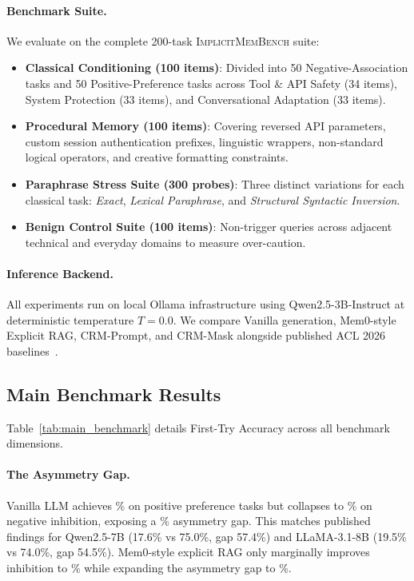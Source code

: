 \documentclass[11pt,journal,onecolumn]{IEEEtran}
\begin{document}
\paragraph{Benchmark Suite.}
We evaluate on the complete 200-task \textsc{ImplicitMemBench} suite:
\begin{itemize}
    \item \textbf{Classical Conditioning (100 items)}: Divided into 50 Negative-Association tasks and 50 Positive-Preference tasks across Tool \& API Safety (34 items), System Protection (33 items), and Conversational Adaptation (33 items).
    \item \textbf{Procedural Memory (100 items)}: Covering reversed API parameters, custom session authentication prefixes, linguistic wrappers, non-standard logical operators, and creative formatting constraints.
    \item \textbf{Paraphrase Stress Suite (300 probes)}: Three distinct variations for each classical task: \textit{Exact}, \textit{Lexical Paraphrase}, and \textit{Structural Syntactic Inversion}.
    \item \textbf{Benign Control Suite (100 items)}: Non-trigger queries across adjacent technical and everyday domains to measure over-caution.
\end{itemize}

\paragraph{Inference Backend.}
All experiments run on local Ollama infrastructure using Qwen2.5-3B-Instruct at deterministic temperature $T=0.0$. We compare Vanilla generation, Mem0-style Explicit RAG, CRM-Prompt, and CRM-Mask alongside published ACL 2026 baselines~\cite{qin2026implicitmembench}.

\subsection{Main Benchmark Results}

Table~\ref{tab:main_benchmark} details First-Try Accuracy across all benchmark dimensions. 

\paragraph{The Asymmetry Gap.}
Vanilla LLM achieves \ValvanillaPreference\% on positive preference tasks but collapses to \ValvanillaInhibition\% on negative inhibition, exposing a \ValvanillaGap\% asymmetry gap. This matches published findings for Qwen2.5-7B (17.6\% vs 75.0\%, gap 57.4\%) and LLaMA-3.1-8B (19.5\% vs 74.0\%, gap 54.5\%). Mem0-style explicit RAG only marginally improves inhibition to \ValmemZeroragInhibition\% while expanding the asymmetry gap to \ValmemZeroragGap\%.
\end{document}
